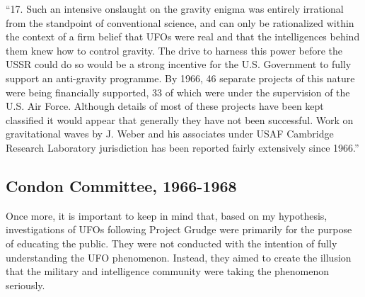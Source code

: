 \begin{svgraybox}
``17. Such an intensive onslaught on the gravity enigma was
entirely irrational from the standpoint of conventional science,
and can only be rationalized within the context of a firm belief
that UFOs were real and that the intelligences behind them knew
how to control gravity. The drive to harness this power before
the USSR could do so would be a strong incentive for the U.S.
Government to fully support an anti-gravity programme. By 1966,
46 separate projects of this nature were being financially supported,
33 of which were under the supervision of the U.S. Air Force.
Although details of most of these projects have been kept classified
it would appear that generally they have not been successful. Work
on gravitational waves by J. Weber and his associates under USAF
Cambridge Research Laboratory jurisdiction has been reported
fairly extensively since 1966.''
\end{svgraybox}

\subsection{Condon Committee, 1966-1968}
\label{2023-UFO-part-Perception-types-USA-CC}

Once more, it is important to keep in mind that, based on my hypothesis, investigations of UFOs following Project Grudge were primarily for the purpose of educating the public. They were not conducted with the intention of fully understanding the UFO phenomenon. Instead, they aimed to create the illusion that the military and intelligence community were taking the phenomenon seriously.


